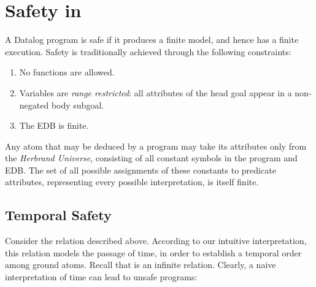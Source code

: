 \section{Safety in \large \bf \slang}

A Datalog program is safe if it produces a finite model, and hence has a finite
execution.  Safety is traditionally achieved through the following constraints:

\begin{enumerate}
%
\item No functions are allowed. 
%
\item Variables are \emph{range restricted}: all attributes of the head goal
appear in a non-negated body subgoal.
%
\item The EDB is finite.
%
\end{enumerate}

Any atom that may be deduced by a program may take its attributes only from the \emph{Herbrand Universe},
consisting of all constant symbols in the program and EDB.
The set of all possible assignments of these constants to predicate attributes,
representing every possible interpretation, is itself finite. 

  
  

\subsection{Temporal Safety}

Consider the  relation described above.  According to our
intuitive interpretation, this relation models the passage of time, in order to
establish a temporal order among ground atoms.  
Recall that  is an infinite relation.  Clearly, a naive
interpretation of time can lead to unsafe programs:

